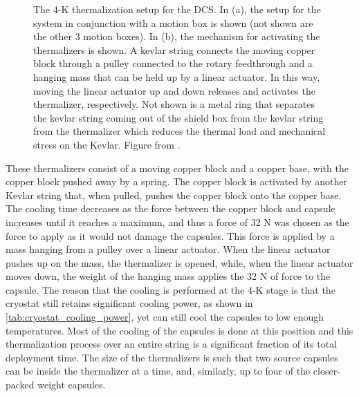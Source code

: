 \begin{figure}[htbp]
\caption[The 4-K thermalization setup for the DCS]
{The 4-K thermalization setup for the DCS.
In (a), the setup for the system in conjunction with a motion box is shown (not shown are the other 3 motion boxes).
In (b), the mechanism for activating the thermalizers is shown.
A kevlar string connects the moving copper block through a pulley connected to the rotary feedthrough and a hanging mass that can be held up by a linear actuator.
In this way, moving the linear actuator up and down releases and activates the thermalizer, respectively.
Not shown is a metal ring that separates the kevlar string coming out of the shield box from the kevlar string from the thermalizer which reduces the thermal load and mechanical stress on the Kevlar.
Figure from \cite{Cushman:2016cnv}.}
\label{fig:DCS_4K_schematic}
\end{figure}

These thermalizers consist of a moving copper block and a copper base, with the copper block pushed away by a spring.
The copper block is activated by another Kevlar string that, when pulled, pushes the copper block onto the copper base.
The cooling time decreases as the force between the copper block and capsule increases until it reaches a maximum, and thus a force of 32 N was chosen as the force to apply as it would not damage the capsules.
This force is applied by a mass hanging from a pulley over a linear actuator. When the linear actuator pushes up on the mass, the thermalizer is opened, while, when the linear actuator moves down, the weight of the hanging mass applies the 32 N of force to the capsule.
The reason that the cooling is performed at the 4-K stage is that the cryostat still retains significant cooling power, as shown in \autoref{tab:cryostat_cooling_power}, yet can still cool the capsules to low enough temperatures.
Most of the cooling of the capsules is done at this position and this thermalization process over an entire string is a significant fraction of its total deployment time.
The size of the thermalizers is such that two source capsules can be inside the thermalizer at a time, and, similarly, up to four of the closer-packed weight capsules.

